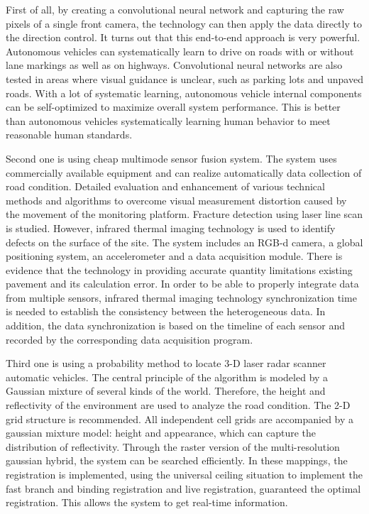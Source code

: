 \documentclass[onecolumn, draftclsnofoot,10pt, compsoc]{IEEEtran}
\begin{document}
First of all, by creating a convolutional neural network and capturing the raw pixels of a single front camera, the technology can then apply the data directly to the direction control.
It turns out that this end-to-end approach is very powerful.
Autonomous vehicles can systematically learn to drive on roads with or without lane markings as well as on highways.
Convolutional neural networks are also tested in areas where visual guidance is unclear, such as parking lots and unpaved roads.
With a lot of systematic learning, autonomous vehicle internal components can be self-optimized to maximize overall system performance.
This is better than autonomous vehicles systematically learning human behavior to meet reasonable human standards.

Second one is using cheap multimode sensor fusion system.
The system uses commercially available equipment and can realize automatically data collection of road condition.
Detailed evaluation and enhancement of various technical methods and algorithms to overcome visual measurement distortion caused by the movement of the monitoring platform.
Fracture detection using laser line scan is studied.
However, infrared thermal imaging technology is used to identify defects on the surface of the site.
The system includes an RGB-d camera, a global positioning system, an accelerometer and a data acquisition module.
There is evidence that the technology in providing accurate quantity limitations existing pavement and its calculation error.
In order to be able to properly integrate data from multiple sensors, infrared thermal imaging technology synchronization time is needed to establish the consistency between the heterogeneous data.
In addition, the data synchronization is based on the timeline of each sensor and recorded by the corresponding data acquisition program.

Third one is using a probability method to locate 3-D laser radar scanner automatic vehicles.
The central principle of the algorithm is modeled by a Gaussian mixture of several kinds of the world.
Therefore, the height and reflectivity of the environment are used to analyze the road condition.
The 2-D grid structure is recommended.
All independent cell grids are accompanied by a gaussian mixture model: height and appearance, which can capture the distribution of reflectivity.
Through the raster version of the multi-resolution gaussian hybrid, the system can be searched efficiently.
In these mappings, the registration is implemented, using the universal ceiling situation to implement the fast branch and binding registration and live registration, guaranteed the optimal registration.
This allows the system to get real-time information.
\end{document}
